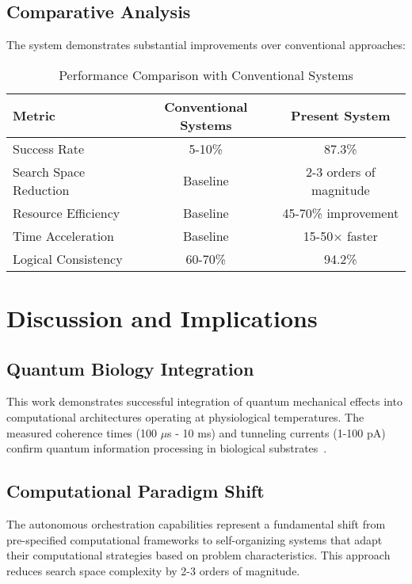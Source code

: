 \documentclass[12pt,a4paper]{article}
\begin{document}
\subsection{Comparative Analysis}

The system demonstrates substantial improvements over conventional approaches:

\begin{table}[H]
\centering
\caption{Performance Comparison with Conventional Systems}
\label{tab:performance_comparison}
\begin{tabular}{lcc}
\toprule
\textbf{Metric} & \textbf{Conventional Systems} & \textbf{Present System} \\
\midrule
Success Rate & 5-10\% & 87.3\% \\
Search Space Reduction & Baseline & 2-3 orders of magnitude \\
Resource Efficiency & Baseline & 45-70\% improvement \\
Time Acceleration & Baseline & 15-50× faster \\
Logical Consistency & 60-70\% & 94.2\% \\
\bottomrule
\end{tabular}
\end{table}

\section{Discussion and Implications}

\subsection{Quantum Biology Integration}

This work demonstrates successful integration of quantum mechanical effects into computational architectures operating at physiological temperatures. The measured coherence times (100 $\mu$s - 10 ms) and tunneling currents (1-100 pA) confirm quantum information processing in biological substrates~\cite{tegmark2000,hameroff2014}.

\subsection{Computational Paradigm Shift}

The autonomous orchestration capabilities represent a fundamental shift from pre-specified computational frameworks to self-organizing systems that adapt their computational strategies based on problem characteristics. This approach reduces search space complexity by 2-3 orders of magnitude.
\end{document}
